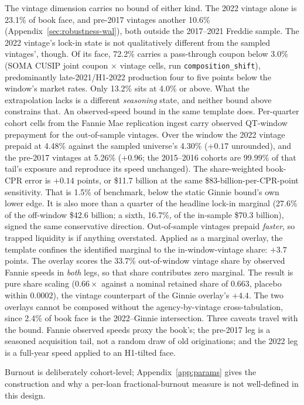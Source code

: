\documentclass[12pt]{article}
\begin{document}
The vintage dimension carries no bound of either kind. The 2022 vintage alone is 23.1\% of book face, and pre-2017 vintages another 10.6\% (Appendix~\ref{sec:robustness-wal}), both outside the 2017--2021 Freddie sample. The 2022 vintage's lock-in state is not qualitatively different from the sampled vintages', though. Of its face, 72.2\% carries a pass-through coupon below 3.0\% (SOMA CUSIP joint coupon $\times$ vintage cells, run \texttt{composition\_shift}), predominantly late-2021/H1-2022 production four to five points below the window's market rates. Only 13.2\% sits at 4.0\% or above. What the extrapolation lacks is a different \emph{seasoning} state, and neither bound above constrains that. An observed-speed bound in the same template does. Per-quarter cohort cells from the Fannie Mae replication ingest carry observed QT-window prepayment for the out-of-sample vintages. Over the window the 2022 vintage prepaid at 4.48\% against the sampled universe's 4.30\% ($+0.17$ unrounded), and the pre-2017 vintages at 5.26\% ($+0.96$; the 2015--2016 cohorts are 99.99\% of that tail's exposure and reproduce its speed unchanged). The share-weighted book-CPR error is $+0.14$ points, or \$11.7 billion at the same \$83-billion-per-CPR-point sensitivity. That is 1.5\% of benchmark, below the static Ginnie bound's own lower edge. It is also more than a quarter of the headline lock-in marginal (27.6\% of the off-window \$42.6 billion; a sixth, 16.7\%, of the in-sample \$70.3 billion), signed the same conservative direction. Out-of-sample vintages prepaid \emph{faster}, so trapped liquidity is if anything overstated. Applied as a marginal overlay, the template confines the identified marginal to the in-window-vintage share: $+3.7$ points. The overlay scores the 33.7\% out-of-window vintage share by observed Fannie speeds in \emph{both} legs, so that share contributes zero marginal. The result is pure share scaling ($0.66\times$ against a nominal retained share of $0.663$, placebo within $0.0002$), the vintage counterpart of the Ginnie overlay's $+4.4$. The two overlays cannot be composed without the agency-by-vintage cross-tabulation, since 2.4\% of book face is the 2022--Ginnie intersection. Three caveats travel with the bound. Fannie observed speeds proxy the book's; the pre-2017 leg is a seasoned acquisition tail, not a random draw of old originations; and the 2022 leg is a full-year speed applied to an H1-tilted face.

Burnout is deliberately cohort-level; Appendix~\ref{app:params} gives the construction and why a per-loan fractional-burnout measure is not well-defined in this design.
\end{document}
